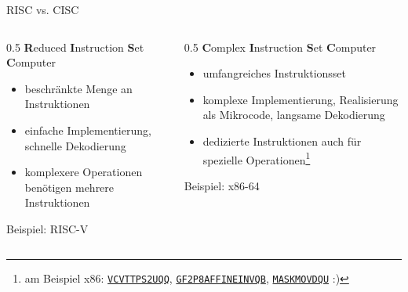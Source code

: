 \begin{frame}[c]{RISC vs. CISC}{}
	\begin{columns}
		\begin{column}{0.5\textwidth}
			\centering\textbf{R}educed \textbf{I}nstruction \textbf{S}et \textbf{C}omputer
			\vspace{0.5\baselineskip}
			\begin{itemize}
				\item beschränkte Menge an Instruktionen
				\item einfache Implementierung, schnelle Dekodierung
				\item komplexere Operationen benötigen mehrere Instruktionen
			\end{itemize}
			\vspace{0.5\baselineskip}
			Beispiel: RISC-V
		\end{column}
		\begin{column}{0.5\textwidth}
			\centering\textbf{C}omplex \textbf{I}nstruction \textbf{S}et \textbf{C}omputer
			\vspace{0.5\baselineskip}
			\begin{itemize}
				\item umfangreiches Instruktionsset
				\item komplexe Implementierung, Realisierung als Mikrocode, langsame Dekodierung
				\item dedizierte Instruktionen auch für spezielle Operationen\footnote[frame]{am Beispiel x86: \href{https://www.felixcloutier.com/x86/vcvttps2uqq}{\texttt{VCVTTPS2UQQ}}, \href{https://www.felixcloutier.com/x86/gf2p8affineinvqb}{\texttt{GF2P8AFFINEINVQB}}, \href{https://www.felixcloutier.com/x86/maskmovdqu}{\texttt{MASKMOVDQU}} :)}
			\end{itemize}
			\vspace{0.5\baselineskip}
			Beispiel: x86-64
		\end{column}
	\end{columns}
\end{frame}

